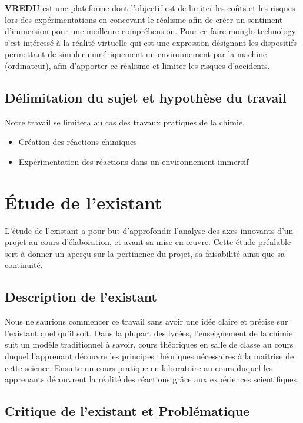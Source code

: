 \textbf{VREDU} est une plateforme dont l’objectif est de limiter les coûts et les risques lors des expérimentations en concevant le réalisme afin de créer un sentiment d’immersion pour une meilleure compréhension. Pour ce faire monglo technology s’est intéressé à la réalité virtuelle qui est une expression désignant les dispositifs permettant de simuler numériquement un environnement par la machine (ordinateur), afin d’apporter ce réalisme et limiter les risques d’accidents.

\subsection{Délimitation du sujet et hypothèse du travail}

Notre travail se limitera au cas des travaux pratiques de la chimie.

\begin{itemize}
	\item Création des réactions chimiques
	\item Expérimentation des réactions dans un environnement immersif
\end{itemize}

\section{Étude de l’existant}

L’étude de l’existant a pour but d'approfondir l'analyse des axes innovants d'un projet au cours d'élaboration, et avant sa mise en œuvre. Cette étude préalable sert à donner un aperçu sur la pertinence du projet, sa faisabilité ainsi que sa continuité.

\subsection{Description de l’existant}

Nous ne saurions commencer ce travail sans avoir une idée claire et précise sur l’existant quel qu’il soit. Dans la plupart des lycées, l’enseignement de la chimie suit un modèle traditionnel à savoir, cours théoriques en salle de classe au cours duquel l’apprenant découvre les principes théoriques nécessaires à la maitrise de cette science. Ensuite un cours pratique en laboratoire au cours duquel les apprenants découvrent la réalité des réactions grâce aux expériences scientifiques.


\subsection{Critique de l’existant et Problématique}

